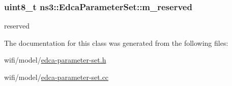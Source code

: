 \subsubsection[{\texorpdfstring{m\+\_\+reserved}{m_reserved}}]{\setlength{\rightskip}{0pt plus 5cm}uint8\+\_\+t ns3\+::\+Edca\+Parameter\+Set\+::m\+\_\+reserved\hspace{0.3cm}{\ttfamily [private]}}\hypertarget{classns3_1_1EdcaParameterSet_a287fbf667f2e4ee7d44af88383dab6c2}{}\label{classns3_1_1EdcaParameterSet_a287fbf667f2e4ee7d44af88383dab6c2}


reserved 



The documentation for this class was generated from the following files\+:\begin{DoxyCompactItemize}
\item 
wifi/model/\hyperlink{edca-parameter-set_8h}{edca-\/parameter-\/set.\+h}\item 
wifi/model/\hyperlink{edca-parameter-set_8cc}{edca-\/parameter-\/set.\+cc}\end{DoxyCompactItemize}
